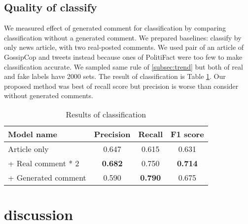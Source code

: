 \documentclass[conference]{IEEEtran}
\begin{document}
\subsection{Quality of classify}
We measured effect of generated comment for classification by comparing classification without a generated comment.
We prepared baselines: classify by only news article, with two real-posted comments.
We used pair of an article of GossipCop and tweets instead because ones of PolitiFact were too few to make classification accurate.
We sampled same rule of \ref{subsec:trend} but both of real and fake labels have 2000 sets.
The result of classification is Table \ref{fig:classify_results}.
Our proposed method was best of recall score but precision is worse than consider without generated comments.
\begin{table}[!t]
    \renewcommand{\arraystretch}{1.3}
    \caption{Results of classification}
    \label{fig:classify_results}
    \centering
    \begin{tabular}{lccc}
    \hline
    Model name           & Precision & Recall & F1 score \\ \hline
    Article only         & 0.647     & 0.615  & 0.631    \\
     + Real comment * 2  & \textbf{0.682}     & 0.750  & \textbf{0.714}    \\
     + Generated comment & 0.590     & \textbf{0.790}  & 0.675    \\ \hline
    \end{tabular}
    \end{table}
\section{discussion}


\end{document}
